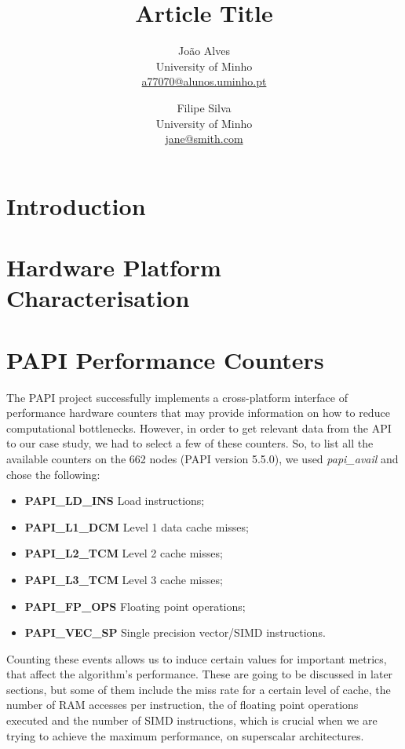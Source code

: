 \documentclass[twoside,twocolumn]{article}
\title{Article Title} %
\author{
João Alves\\[1ex] %
\normalsize University of Minho \\ %
\normalsize \href{mailto:a77070@alunos.uminho.pt}{a77070@alunos.uminho.pt} %
\and %
Filipe Silva\\[1ex] %
\normalsize University of Minho \\ %
\normalsize \href{mailto:jane@smith.com}{jane@smith.com} %
}
\date{} %
\begin{document}
\maketitle


\section{Introduction}

\blindtext %

\section{Hardware Platform Characterisation}

\blindtext

\section{PAPI Performance Counters}

The PAPI project successfully implements a cross-platform interface of performance hardware counters that may provide information on how to reduce computational bottlenecks. However, in order to get relevant data from the API to our case study, we had to select a few of these counters. So, to list all the available counters on the 662 nodes (PAPI version 5.5.0), we used \emph{papi\_avail} and chose the following:

\begin{itemize}
    \item \textbf{PAPI\_LD\_INS} Load instructions;
    \item \textbf{PAPI\_L1\_DCM} Level 1 data cache misses;
    \item \textbf{PAPI\_L2\_TCM} Level 2 cache misses;
    \item \textbf{PAPI\_L3\_TCM} Level 3 cache misses;
    \item \textbf{PAPI\_FP\_OPS} Floating point operations;
    \item \textbf{PAPI\_VEC\_SP} Single precision vector/SIMD instructions.
\end{itemize}

Counting these events allows us to induce certain values for important metrics, that affect the algorithm's performance. These are going to be discussed in later sections, but some of them include the miss rate for a certain level of cache, the number of RAM accesses per instruction, the of floating point operations executed and the number of SIMD instructions, which is crucial when we are trying to achieve the maximum performance, on superscalar architectures.
\end{document}
